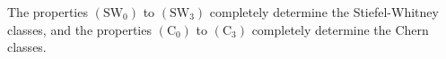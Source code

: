 The properties $(\text{SW}_0)$ to $(\text{SW}_3)$ completely determine the Stiefel-Whitney classes, and the properties $(\text{C}_0)$ to $(\text{C}_3)$ completely determine the Chern classes.
